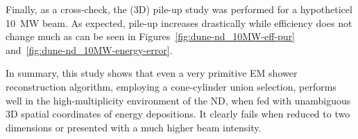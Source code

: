 Finally, as a cross-check, the (3D) pile-up study was performed for a hypotheticel \SI{10}{\mega\watt} beam.
As expected, pile-up increases drastically while efficiency does not change much as can be seen in Figures~\ref{fig:dune-nd_10MW-eff-pur} and~\ref{fig:dune-nd_10MW-energy-error}.

In summary, this study shows that even a very primitive EM shower reconstruction algorithm, employing a cone-cylinder union selection, performs well in the high-multiplicity environment of the \dune{} ND, when fed with unambiguous 3D spatial coordinates of energy depositions.
It clearly fails when reduced to two dimensions or presented with a much higher beam intensity.